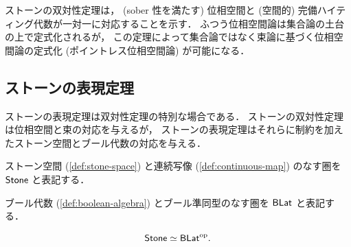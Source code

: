 \documentclass[titlepage]{ltjsreport}
\newtheorem[S]{theorem}{定理}[chapter]
\newtheorem[S]{definition}[theorem]{定義}
\newtheorem[S]{example}[theorem]{例}
\begin{document}
ストーンの双対性定理は，
(sober 性を満たす)
位相空間と
(空間的)
完備ハイティング代数が一対一に対応することを示す．
ふつう位相空間論は集合論の土台の上で定式化されるが，
この定理によって集合論ではなく束論に基づく位相空間論の定式化
(ポイントレス位相空間論)
が可能になる．

\subsection{ストーンの表現定理}

ストーンの表現定理は双対性定理の特別な場合である．
ストーンの双対性定理は位相空間と束の対応を与えるが，
ストーンの表現定理はそれらに制約を加えたストーン空間とブール代数の対応を与える．

\begin{definition}[ストーン空間の圏]
  ストーン空間
  (\cref{def:stone-space})
  と連続写像
  (\cref{def:continuous-map})
  のなす圏を $\mathsf{Stone}$ と表記する．
\end{definition}

\begin{definition}[ブール代数の圏]
  ブール代数 (\cref{def:boolean-algebra})
  とブール準同型のなす圏を $\mathsf{BLat}$ と表記する．
\end{definition}

\newcommand{\spec}{\operatorname{spec}}
\newcommand{\clop}{\operatorname{clop}}

\begin{theorem}[ストーンの表現定理]
  \begin{equation}
    \mathsf{Stone}\simeq\mathsf{BLat}^\mathrm{op}.
  \end{equation}
\end{theorem}
\end{document}

